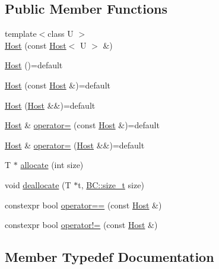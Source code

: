 \subsection*{Public Member Functions}
\begin{DoxyCompactItemize}
\item 
{\footnotesize template$<$class U $>$ }\\\hyperlink{structBC_1_1allocators_1_1Host_a037aaf2e55afe33aca7cd18baf5dbead}{Host} (const \hyperlink{structBC_1_1allocators_1_1Host}{Host}$<$ U $>$ \&)
\item 
\hyperlink{structBC_1_1allocators_1_1Host_ab4788e4e41d64a605e8cce57b02f6864}{Host} ()=default
\item 
\hyperlink{structBC_1_1allocators_1_1Host_a67f8ac90a95dc64e203da5360359f91f}{Host} (const \hyperlink{structBC_1_1allocators_1_1Host}{Host} \&)=default
\item 
\hyperlink{structBC_1_1allocators_1_1Host_a3866b82b461d0672eaf3b0a4bf357363}{Host} (\hyperlink{structBC_1_1allocators_1_1Host}{Host} \&\&)=default
\item 
\hyperlink{structBC_1_1allocators_1_1Host}{Host} \& \hyperlink{structBC_1_1allocators_1_1Host_a9d5fdb05dd11397ba72886f9792749b1}{operator=} (const \hyperlink{structBC_1_1allocators_1_1Host}{Host} \&)=default
\item 
\hyperlink{structBC_1_1allocators_1_1Host}{Host} \& \hyperlink{structBC_1_1allocators_1_1Host_abdaf8b95eddbc30f4da271d34aabc22d}{operator=} (\hyperlink{structBC_1_1allocators_1_1Host}{Host} \&\&)=default
\item 
T $\ast$ \hyperlink{structBC_1_1allocators_1_1Host_abd5afca4a1205509c7af2530f6a380a5}{allocate} (int size)
\item 
void \hyperlink{structBC_1_1allocators_1_1Host_a35c45682d1d5a718de9711184357b10c}{deallocate} (T $\ast$t, \hyperlink{namespaceBC_a6007cbc4eeec401a037b558910a56173}{B\+C\+::size\+\_\+t} size)
\item 
constexpr bool \hyperlink{structBC_1_1allocators_1_1Host_aec0455855e645036d2e4ddce17cdddf1}{operator==} (const \hyperlink{structBC_1_1allocators_1_1Host}{Host} \&)
\item 
constexpr bool \hyperlink{structBC_1_1allocators_1_1Host_a816b53acd1139a98d994c2a38e551bdc}{operator!=} (const \hyperlink{structBC_1_1allocators_1_1Host}{Host} \&)
\end{DoxyCompactItemize}


\subsection{Member Typedef Documentation}
